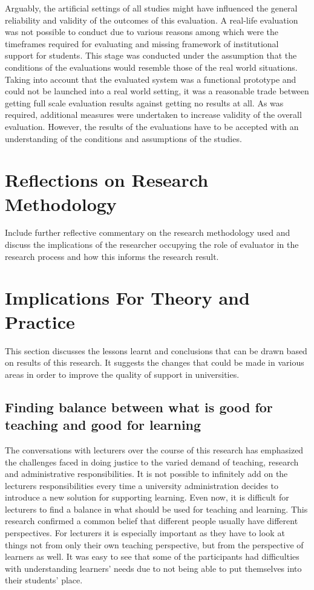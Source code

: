 Arguably, the artificial settings of all studies might have influenced the
general reliability and validity of the outcomes of this evaluation. A real-life
evaluation was not possible to conduct due to various reasons among which were
the timeframes required for evaluating \LLLs and missing framework of
institutional support for students. This stage was conducted under the
assumption that the conditions of the evaluations would resemble those of the
real world situations. Taking into account that the evaluated system was a
functional prototype and could not be launched into a real world setting, it
was a reasonable trade between getting full scale evaluation results against
getting no results at all. As was required, additional measures were undertaken
to increase validity of the overall evaluation. However, the results of the
evaluations have to be accepted with an understanding of the conditions and
assumptions of the studies.

\section{Reflections on Research Methodology}

Include further reflective commentary on the research methodology used and
discuss the implications of the researcher occupying the role of evaluator in
the research process and how this informs the research result.

\section{Implications For Theory and Practice}

This section discusses the lessons learnt and conclusions that can be drawn
based on results of this research. It suggests the changes that could be made in
various areas in order to improve the quality of \LLLs support in universities.

\subsection[Finding Balance]{Finding balance between what is good for teaching
and good for learning}

The conversations with lecturers over the course of this research has emphasized
the challenges faced in doing justice to the varied demand of teaching, research
and administrative responsibilities. It is not possible to infinitely add on the
lecturers responsibilities every time a university administration decides to
introduce a new solution for supporting learning. Even now, it is difficult for
lecturers to find a balance in what should be used for teaching and learning.
This research confirmed a common belief that different people usually have
different perspectives. For lecturers it is especially important as they have to
look at things not from only their own teaching perspective, but from the
perspective of learners as well. It was easy to see that some of the
participants had difficulties with understanding learners' needs due to not
being able to put themselves into their students' place.

